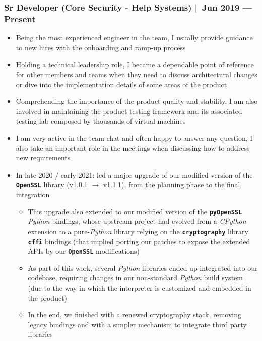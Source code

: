 \documentclass[12pt, a4paper]{article}
\newcommand{\mysep}{{\Large $\mid$}\ }
\newcommand{\lib}[1]{\texttt{\textbf{#1}}}
\newcommand{\python}{\emph{Python}}
\begin{document}
    \subsubsection*{Sr Developer (Core Security - Help Systems) \mysep Jun 2019 --- Present}
    \begin{itemize}
        \item Being the most experienced engineer in the team, I usually
        provide guidance to new hires with the onboarding and ramp-up process
        \item Holding a technical leadership role, I became
        a dependable point of reference for other members and teams
        when they need to discuss architectural changes
        or dive into the implementation details of some areas of the product
        \item Comprehending the importance of the product quality and stability,
        I am also involved in maintaining the product testing framework
        and its associated testing lab composed by thousands of virtual machines
        \item I am very active in the team chat
        and often happy to answer any question,
        I also take an important role in the meetings
        when discussing how to address new requirements
        \item In late 2020 / early 2021: led a major upgrade of
        our modified version of the \lib{OpenSSL} library (v1.0.1 $\rightarrow$ v1.1.1),
        from the planning phase to the final integration
        \begin{itemize}
            \item This upgrade also extended to our modified version of the \lib{pyOpenSSL} \python{} bindings,
            whose upstream project had evolved from a \emph{CPython} extension to a pure-\python{} library
            relying on the \lib{cryptography} library \lib{cffi} bindings
            (that implied porting our patches to expose the extended APIs by our \lib{OpenSSL} modifications)
            \item As part of this work, several \python{} libraries ended up integrated
            into our codebase, requiring changes in our non-standard \python{} build system
            (due to the way in which the interpreter is customized and embedded in the product)
            \item In the end, we finished with a renewed cryptography stack,
            removing legacy bindings and with a simpler mechanism to integrate third party libraries

\end{itemize}
\end{itemize}
\end{document}
